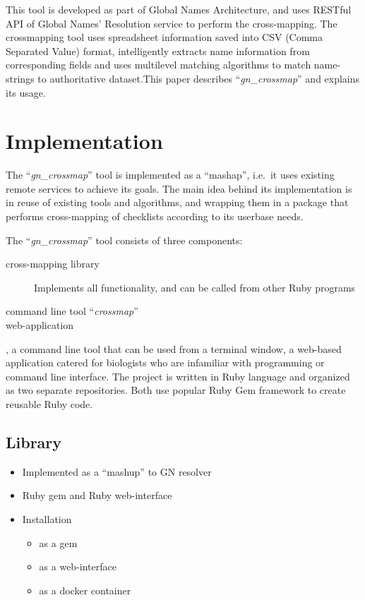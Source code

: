 \documentclass{bmcart}
\begin{document}
  This tool is developed as part of Global Names Architecture, and uses RESTful
  API of Global Names' Resolution service to perform the cross-mapping. The
  crossmapping tool uses spreadsheet information saved into CSV (Comma
  Separated Value) format, intelligently extracts name information from
  corresponding fields and uses multilevel matching algorithms to match
  name-strings to authoritative dataset.This paper describes
  ``\textit{gn\_crossmap}'' and explains its usage.


\section*{Implementation}

The ``\textit{gn\_crossmap}'' tool is implemented as a ``mashap'', i.e.\ it
uses existing remote services to achieve its goals. The main idea behind its
implementation is in reuse of existing tools and algorithms, and wrapping them
in a package that performs cross-mapping of checklists according to its
userbase needs.

The ``\textit{gn\_crossmap}'' tool consists of three components:

\begin{description}
  \item[cross-mapping library] Implements all functionality, and can be called
    from other Ruby programs
  \item[command line tool ``\textit{crossmap}'']
  \item [web-application]
\end{description}

, a
command line tool that can be used from a terminal window, a web-based
application catered for biologists who are infamiliar with programming or
command line interface. The project is written in Ruby language and organized
as two separate repositories. Both use popular Ruby Gem framework to create
reusable Ruby code.

\subsection*{Library}


\begin{itemize}
  \item Implemented as a ``mashup'' to GN resolver
  \item Ruby gem and Ruby web-interface
  \item Installation
    \begin{itemize}
      \item as a gem
      \item as a web-interface
      \item as a docker container
    \end{itemize}
\end{itemize}
\end{document}
